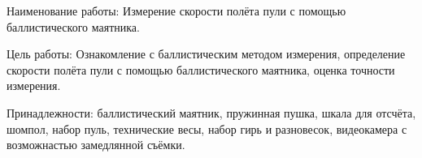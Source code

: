 Наименование работы:
Измерение скорости полёта пули с помощью баллистического маятника.

Цель работы:
Ознакомление с баллистическим методом измерения,
определение скорости полёта пули с помощью баллистического маятника,
оценка точности измерения.

Принадлежности:
баллистический маятник, пружинная пушка, шкала для отсчёта, шомпол,
набор пуль, технические весы, набор гирь и разновесок,
видеокамера с возможнастью замедлянной съёмки.
